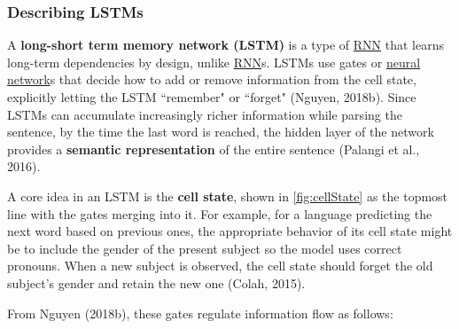 \subsubsection{Describing LSTMs}

A \textbf{long-short term memory network (LSTM)} is a type of \hyperref[sec:RNN]{RNN} that learns long-term dependencies by design, unlike \hyperref[sec:RNN]{RNN}s. LSTMs use gates or \hyperref[sec:NeuralLM]{neural network}s that decide how to add or remove information from the cell state, explicitly letting the LSTM ``remember" or ``forget" (Nguyen, 2018b). Since LSTMs can accumulate increasingly richer information while parsing the sentence, by the time the last word is reached, the hidden layer of the network provides a \textbf{semantic representation} of the entire sentence (Palangi et al., 2016). 

A core idea in an LSTM is the \textbf{cell state}, shown in \cref{fig:cellState} as the topmost line with the gates merging into it. For example, for a language predicting the next word based on previous ones, the appropriate behavior of its cell state might be to include the gender of the present subject so the model uses correct pronouns. When a new subject is observed, the cell state should forget the old subject's gender and retain the new one (Colah, 2015). 

From Nguyen (2018b), these gates regulate information flow as follows: 


\clearpage



